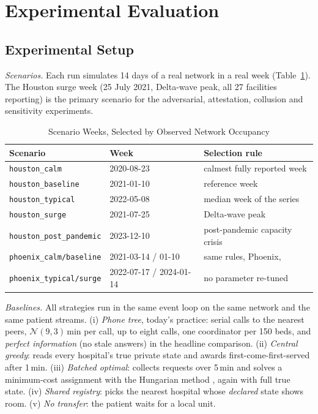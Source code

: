 \section{Experimental Evaluation}
\label{sec:evaluation}

\subsection{Experimental Setup}
\emph{Scenarios.} Each run simulates 14 days of a real network in a real week (Table~\ref{tab:weeks}). The Houston surge week (25 July 2021, Delta-wave peak, all 27 facilities reporting) is the primary scenario for the adversarial, attestation, collusion and sensitivity experiments.

\begin{table}[!t]
\centering
\caption{Scenario Weeks, Selected by Observed Network Occupancy}
\label{tab:weeks}
\scriptsize
\setlength{\tabcolsep}{2.5pt}
\begin{tabular}{@{}llp{2.75cm}@{}}
\toprule
Scenario & Week & Selection rule \\
\midrule
\texttt{houston\_calm} & 2020-08-23 & calmest fully reported week \\
\texttt{houston\_baseline} & 2021-01-10 & reference week \\
\texttt{houston\_typical} & 2022-05-08 & median week of the series \\
\texttt{houston\_surge} & 2021-07-25 & Delta-wave peak \\
\texttt{houston\_post\_pandemic} & 2023-12-10 & post-pandemic capacity crisis \\
\midrule
\texttt{phoenix\_calm/baseline} & 2021-03-14 / 01-10 & same rules, Phoenix, \\
\texttt{phoenix\_typical/surge} & 2022-07-17 / 2024-01-14 & no parameter re-tuned \\
\bottomrule
\end{tabular}
\end{table}

\emph{Baselines.} All strategies run in the same event loop on the same network and the same patient streams.
(i) \emph{Phone tree}, today's practice: serial calls to the nearest peers, $\mathcal{N}(9,3)$\,min per call, up to eight calls, one coordinator per 150 beds, and \emph{perfect information} (no stale answers) in the headline comparison.
(ii) \emph{Central greedy}: reads every hospital's true private state and awards first-come-first-served after 1\,min.
(iii) \emph{Batched optimal}: collects requests over 5\,min and solves a minimum-cost assignment with the Hungarian method \cite{kuhn1955hungarian}, again with full true state.
(iv) \emph{Shared registry}: picks the nearest hospital whose \emph{declared} state shows room.
(v) \emph{No transfer}: the patient waits for a local unit.

